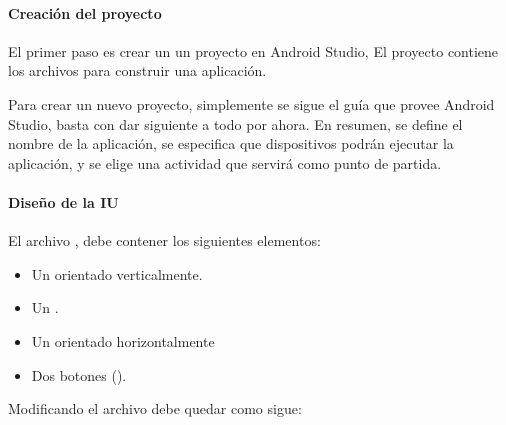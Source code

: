 \paragraph{Creación del proyecto}
\label{\detokenize{dev_docs:creacion-del-proyecto}}
El primer paso es crear un un proyecto en Android Studio, El proyecto contiene
los archivos para construir una aplicación.

Para crear un nuevo proyecto, simplemente se sigue el guía que provee Android
Studio, basta con dar siguiente a todo por ahora.
En resumen, se define el nombre
de la aplicación, se especifica que dispositivos podrán ejecutar la aplicación,
y se elige una actividad que servirá como punto de partida.


\paragraph{Diseño de la IU}
\label{\detokenize{dev_docs:diseno-de-la-iu}}
El archivo , debe contener los siguientes elementos:
\begin{itemize}
\item {} 
Un  orientado verticalmente.

\item {} 
Un .

\item {} 
Un  orientado horizontalmente

\item {} 
Dos botones ().

\end{itemize}

Modificando el archivo debe quedar como sigue:

